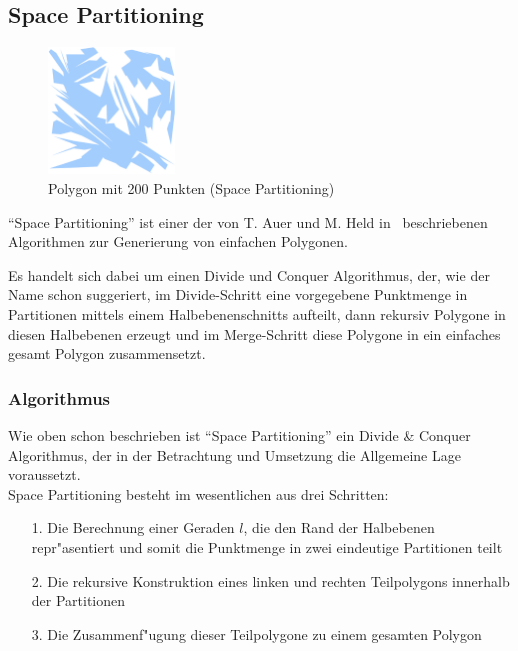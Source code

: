 
\subsection{Space Partitioning}

  \begin{figure}[h]
    \begin{center}
      \includegraphics[width=0.3\textwidth]{img/spacepart200.eps}
    \end{center}
    \caption{Polygon mit 200 Punkten (Space Partitioning)}
    \label{fig:space200}
  \end{figure}

  \enquote{Space Partitioning} ist einer der von T. Auer und M. Held 
  in~\cite{held98polygons} beschriebenen Algorithmen zur Generierung von
  einfachen Polygonen.


  Es handelt sich dabei um einen Divide und Conquer Algorithmus, der, wie der
  Name schon suggeriert, im Divide-Schritt eine vorgegebene Punktmenge in
  Partitionen mittels einem Halbebenenschnitts aufteilt, dann rekursiv Polygone
  in diesen Halbebenen erzeugt und im Merge-Schritt diese Polygone in ein
  einfaches gesamt Polygon zusammensetzt.

  \subsubsection{Algorithmus}

    Wie oben schon beschrieben ist \enquote{Space Partitioning} ein 
    Divide \& Conquer
    Algorithmus, der in der Betrachtung und Umsetzung die Allgemeine Lage
    voraussetzt. \\

    \noindent
    Space Partitioning besteht im wesentlichen aus drei Schritten:
    \begin{itemize}
      \item[1.] Die Berechnung einer Geraden $l$, die den Rand der Halbebenen 
            repr"asentiert und somit die Punktmenge in zwei eindeutige 
            Partitionen teilt
      \item[2.] Die rekursive Konstruktion eines linken und rechten 
            Teilpolygons innerhalb der Partitionen
      \item[3.] Die Zusammenf"ugung dieser Teilpolygone zu einem gesamten 
            Polygon
    \end{itemize}

